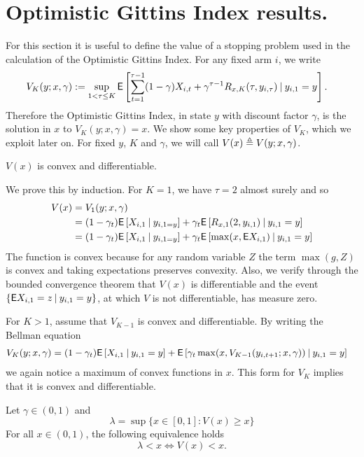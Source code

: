 \section{Optimistic Gittins Index results.} \label{sec:amgi_results}
For this section it is useful to define the value of a stopping problem used in the calculation of the Optimistic Gittins Index. For any fixed arm $i$, we write
\begin{align*}
V_K(y; x, \gamma) & := \sup_{1 < \tau \le K} \mathsf{E} \left[ \sum_{t=1}^{\tau-1} (1-\gamma)X_{i,t} + \gamma^{\tau-1} R_{x, K}(\tau, y_{i,\tau})	\:\vert\: y_{i,1} = y \right].
\end{align*}
Therefore the Optimistic Gittins Index, in state $y$ with discount factor $\gamma$, is the solution in $x$ to $V_K(y; x, \gamma) = x$. We show some key properties of $V_K$, which we exploit later on. For fixed $y$, $K$ and $\gamma$, we will call $V(x) \triangleq V(y; x, \gamma)$.
\begin{fact}
	$V(x)$ is convex and differentiable.
\end{fact}
\begin{myproof}[Proof.]
	We prove this by induction. For $K = 1$, we have $\tau = 2$ almost surely and so
	\begin{align*}
	V(x) & = V_1(y; x, \gamma) \\
	& = (1-\gamma_t)\mathsf{E} \left[ X_{i,1} \:\vert\: y_{i,1 = y} \right] + \gamma_t \mathsf{E} \left[ R_{x, 1}(2, y_{i,1}) \:\vert\: y_{i,1} = y \right] \\
	& = (1-\gamma_t)\mathsf{E} \left[ X_{i,1} \:\vert\: y_{i,1 = y} \right] + \gamma_t \mathsf{E} \left[ \max(x, \mathsf{E}{X_{i,1}}) \:\vert\: y_{i,1} = y \right]
	\end{align*}
	The function is convex because for any random variable $Z$ the term $\max(g, Z)$ is convex and taking expectations preserves convexity. Also, we verify through the bounded convergence theorem that $V(x)$ is differentiable and the event $\{\mathsf{E} X_{i,1}=z \:\vert\: y_{i,1} = y\}$, at which $V$ is not differentiable, has measure zero.
	
	For $K > 1$, assume that $V_{K-1}$ is convex and differentiable. By writing the Bellman equation
	\begin{align*}
		V_K(y; x, \gamma) & = (1-\gamma_t)\mathsf{E} \left[ X_{i,1} \:\vert\: y_{i,1}=y \right] + \mathsf{E} \left[ \gamma_t \max(x, V_{K-1}(y_{i,t+1}; x, \gamma)) \:\vert\: y_{i,1} = y \right]
	\end{align*}
	we again notice a maximum of convex functions in $x$. This form for $V_K$ implies that it is convex and differentiable.
\end{myproof}
\begin{lemma} \label{eq:important_fact}
	Let $\gamma \in (0,1)$ and
	\begin{equation} \label{eq:def_lambda_in_important_equiv}
	\lambda = \sup\{ x \in [0,1] : V(x) \ge x\}
	\end{equation} 
	For all $x \in (0,1)$, the following equivalence holds
	\begin{equation} \label{eq:equivlance_lambda1}
	\lambda < x  \Longleftrightarrow V(x) < x.
	\end{equation}
\end{lemma}
